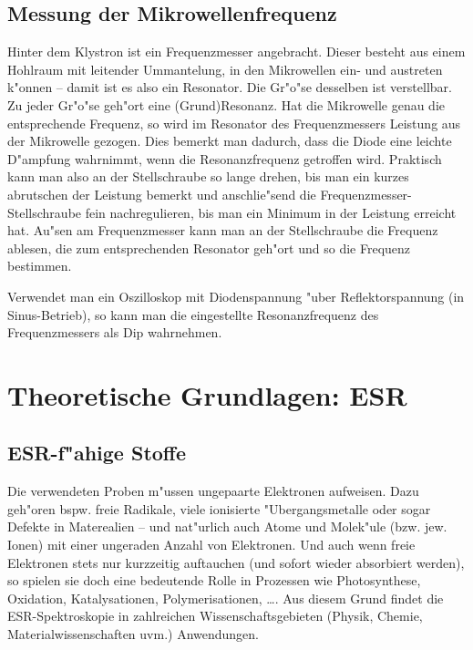 \documentclass[a4paper,12pt]{article}
\begin{document}
\subsection{Messung der Mikrowellenfrequenz}
\label{sec:messung_der_mikrowellenfrequenz}

Hinter dem Klystron ist ein Frequenzmesser angebracht. Dieser besteht
aus einem Hohlraum mit leitender Ummantelung, in den Mikrowellen ein-
und austreten k"onnen -- damit ist es also ein Resonator. Die Gr"o"se
desselben ist verstellbar. Zu jeder Gr"o"se geh"ort eine
(Grund)Resonanz. Hat die Mikrowelle genau die entsprechende Frequenz,
so wird im Resonator des Frequenzmessers Leistung aus der Mikrowelle
gezogen. Dies bemerkt man dadurch, dass die Diode eine leichte
D"ampfung wahrnimmt, wenn die Resonanzfrequenz getroffen
wird. Praktisch kann man also an der Stellschraube so lange drehen,
bis man ein kurzes abrutschen der Leistung bemerkt und anschlie"send
die Frequenzmesser-Stellschraube fein nachregulieren, bis man ein
Minimum in der Leistung erreicht hat.  Au"sen am Frequenzmesser kann
man an der Stellschraube die Frequenz ablesen, die zum entsprechenden
Resonator geh"ort und so die Frequenz bestimmen.


Verwendet man ein Oszilloskop mit Diodenspannung "uber
Reflektorspannung (in Sinus-Betrieb), so kann man die eingestellte
Resonanzfrequenz des Frequenzmessers als Dip wahrnehmen.




\section{Theoretische Grundlagen: ESR}
\label{sec:grundlagen}



\subsection{ESR-f"ahige Stoffe}
\label{sec:esr_fahige_stoffe}

Die verwendeten Proben m"ussen ungepaarte Elektronen aufweisen. Dazu
geh"oren bspw. freie Radikale, viele ionisierte "Ubergangsmetalle oder
sogar Defekte in Materealien -- und nat"urlich auch Atome und
Molek"ule (bzw. jew. Ionen) mit einer ungeraden Anzahl von
Elektronen. Und auch wenn freie Elektronen stets nur kurzzeitig
auftauchen (und sofort wieder absorbiert werden), so spielen sie doch
eine bedeutende Rolle in Prozessen wie Photosynthese, Oxidation,
Katalysationen, Polymerisationen, \dots . Aus diesem Grund findet die
ESR-Spektroskopie in zahlreichen Wissenschaftsgebieten (Physik,
Chemie, Materialwissenschaften uvm.) Anwendungen.
\end{document}
